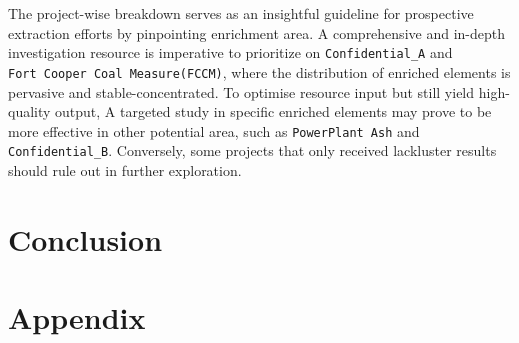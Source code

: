 \documentclass[11pt,a4paper,]{article}
\begin{document}
The project-wise breakdown serves as an insightful guideline for prospective extraction efforts by pinpointing enrichment area. A comprehensive and in-depth investigation resource is imperative to prioritize on \texttt{Confidential\_A} and \texttt{Fort\ Cooper\ Coal\ Measure(FCCM)}, where the distribution of enriched elements is pervasive and stable-concentrated. To optimise resource input but still yield high-quality output, A targeted study in specific enriched elements may prove to be more effective in other potential area, such as \texttt{PowerPlant\ Ash} and \texttt{Confidential\_B}. Conversely, some projects that only received lackluster results should rule out in further exploration.

\section{Conclusion}\label{conclusion}

\section{Appendix}\label{appendix}

\newpage

\printbibliography[title=Reference]
\end{document}
